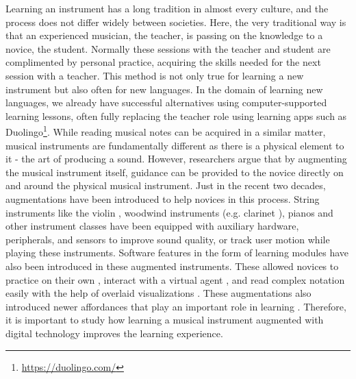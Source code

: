 \documentclass[sigconf, screen, review]{acmart}
\begin{document}
Learning an instrument has a long tradition in almost every culture, and the process does not differ widely between societies. Here, the very traditional way is that an experienced musician, the teacher, is passing on the knowledge to a novice, the student. Normally these sessions with the teacher and student are complimented by personal practice, acquiring the skills needed for the next session with a teacher. This method is not only true for learning a new instrument but also often for new languages. In the domain of learning new languages, we already have successful alternatives using computer-supported learning lessons, often fully replacing the teacher role using learning apps such as Duolingo\footnote{\url{https://duolingo.com/}}. While reading musical notes can be acquired in a similar matter, musical instruments are fundamentally different as there is a physical element to it - the art of producing a sound. However, researchers argue that by augmenting the musical instrument itself, guidance can be provided to the novice directly on and around the physical musical instrument. Just in the recent two decades, augmentations have been introduced to help novices in this process. String instruments like the violin \cite{overholt2005overtone}, woodwind instruments (e.g. clarinet \cite{silva2008interaction}), pianos \cite{mcpherson2010augmenting} and other instrument classes \cite{turchet2018some, newton2011examining} have been equipped with auxiliary hardware, peripherals, and sensors to improve sound quality, or track user motion while playing these instruments. Software features in the form of learning modules have also been introduced in these augmented instruments. These allowed novices to practice on their own \cite{fober2007vemus}, interact with a virtual agent \cite{costalonga2008agent, tidemann2009groovy}, and read complex notation easily with the help of overlaid visualizations \cite{trujano2018arpiano, gerry2019adept, santiniaugmented}. These augmentations also introduced newer affordances that play an important role in learning \cite{dede1996evolution}. Therefore, it is important to study how learning a musical instrument augmented with digital technology improves the learning experience.
\end{document}
